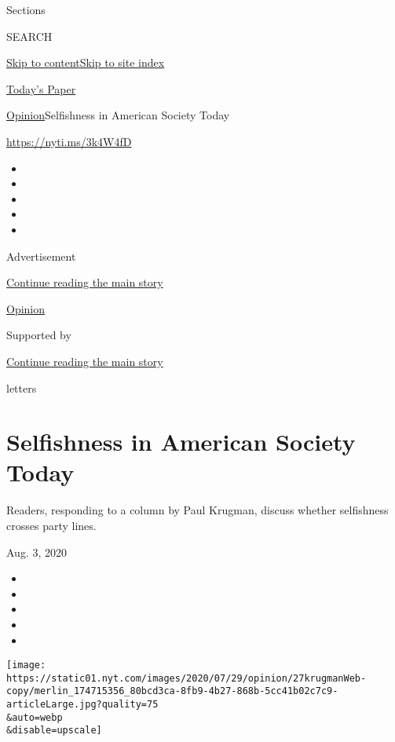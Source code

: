 Sections

SEARCH

\protect\hyperlink{site-content}{Skip to
content}\protect\hyperlink{site-index}{Skip to site index}

\href{https://myaccount.nytimes.com/auth/login?response_type=cookie\&client_id=vi}{}

\href{https://www.nytimes.com/section/todayspaper}{Today's Paper}

\href{/section/opinion}{Opinion}\textbar{}Selfishness in American
Society Today

\url{https://nyti.ms/3k4W4fD}

\begin{itemize}
\item
\item
\item
\item
\item
\end{itemize}

Advertisement

\protect\hyperlink{after-top}{Continue reading the main story}

\href{/section/opinion}{Opinion}

Supported by

\protect\hyperlink{after-sponsor}{Continue reading the main story}

letters

\hypertarget{selfishness-in-american-society-today}{%
\section{Selfishness in American Society
Today}\label{selfishness-in-american-society-today}}

Readers, responding to a column by Paul Krugman, discuss whether
selfishness crosses party lines.

Aug. 3, 2020

\begin{itemize}
\item
\item
\item
\item
\item
\end{itemize}

\texttt{[image: https://static01.nyt.com/images/2020/07/29/opinion/27krugmanWeb-copy/merlin\_174715356\_80bcd3ca-8fb9-4b27-868b-5cc41b02c7c9-articleLarge.jpg?quality=75\\\&auto=webp\\\&disable=upscale]}

